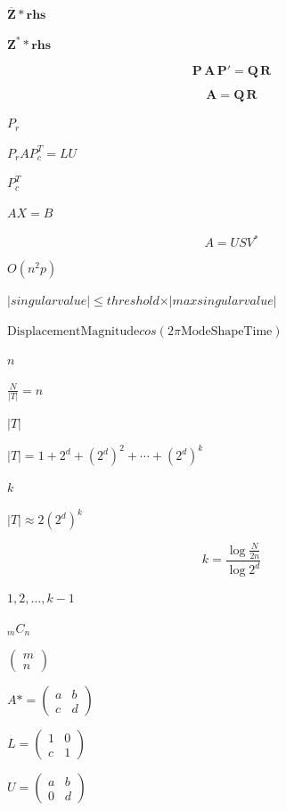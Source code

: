 \documentclass{article}
\begin{document}
$ \mathbf{\overline Z} * \mathbf{rhs} $
\pagebreak

$ \mathbf{Z}^* * \mathbf{rhs} $
\pagebreak

\[ \mathbf{P} \, \mathbf{A} \, \mathbf{P}' = \mathbf{Q} \, \mathbf{R}
\]
\pagebreak

\[ \mathbf{A} = \mathbf{Q} \, \mathbf{R}
\]
\pagebreak

$ P_r $
\pagebreak

$P_r A P_c^T = L U$
\pagebreak

$ P_c^T $
\pagebreak

$ A X = B $
\pagebreak

\[ A = U S V^* \]
\pagebreak

$ O(n^2p) $
\pagebreak

$ \vert singular value \vert \leqslant threshold \times \vert max singular value \vert $
\pagebreak

$ \mathrm{DisplacementMagnitude} cos( 2\pi \mathrm{ModeShapeTime} ) $
\pagebreak

$n$
\pagebreak

$\frac{N}{|T|} = n$
\pagebreak

$|T|$
\pagebreak

$|T| = 1 + 2^d + \left(2^d\right)^2 + \cdots + \left(2^d\right)^k$
\pagebreak

$k$
\pagebreak

$|T|\approx 2 \left(2^d\right)^k$
\pagebreak

\[ k = \frac{\log{\frac{N}{2n}}}{\log{2^d}} \]
\pagebreak

$1, 2, \ldots, k-1$
\pagebreak

$_mC_n$
\pagebreak

$\left(\begin{array}{c}m \\ n\end{array}\right)$
\pagebreak

$ A* = \left( \begin{array}{cc}
a & b \\ c & d \end{array} \right)$
\pagebreak

$ L = \left( \begin{array}{cc}
1 & 0 \\ c & 1 \end{array} \right)$
\pagebreak

$ U = \left( \begin{array}{cc}
a & b \\ 0 & d \end{array} \right)$
\pagebreak
\end{document}

